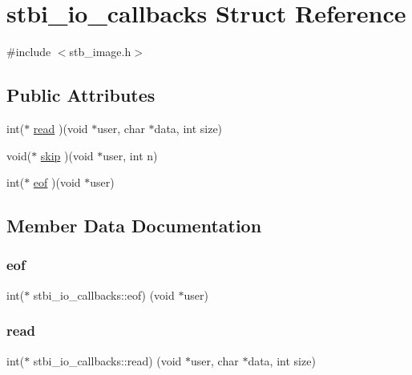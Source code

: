 \hypertarget{structstbi__io__callbacks}{}\section{stbi\+\_\+io\+\_\+callbacks Struct Reference}
\label{structstbi__io__callbacks}


{\ttfamily \#include $<$stb\+\_\+image.\+h$>$}

\subsection*{Public Attributes}
\begin{DoxyCompactItemize}
\item 
int($\ast$ \mbox{\hyperlink{structstbi__io__callbacks_a623e46b3a2a019611601409926283a88}{read}} )(void $\ast$user, char $\ast$data, int size)
\item 
void($\ast$ \mbox{\hyperlink{structstbi__io__callbacks_a257aac5480a90a6c4b8fbe86c1b01068}{skip}} )(void $\ast$user, int n)
\item 
int($\ast$ \mbox{\hyperlink{structstbi__io__callbacks_a319639db2f76e715eed7a7a974136832}{eof}} )(void $\ast$user)
\end{DoxyCompactItemize}


\subsection{Member Data Documentation}
\mbox{\label{structstbi__io__callbacks_a319639db2f76e715eed7a7a974136832}} 
\subsubsection{\texorpdfstring{eof}{eof}}
{\footnotesize\ttfamily int($\ast$ stbi\+\_\+io\+\_\+callbacks\+::eof) (void $\ast$user)}

\mbox{\label{structstbi__io__callbacks_a623e46b3a2a019611601409926283a88}} 
\subsubsection{\texorpdfstring{read}{read}}
{\footnotesize\ttfamily int($\ast$ stbi\+\_\+io\+\_\+callbacks\+::read) (void $\ast$user, char $\ast$data, int size)}

